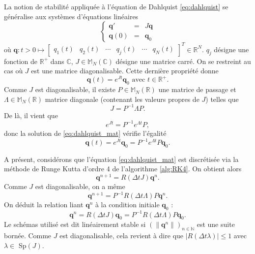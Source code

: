 La notion de stabilité appliquée à l'équation de Dahlquist \eqref{eq:dahlquist} se généralise aux systèmes d'équations linéaires
\begin{equation}
\left\lbrace
\begin{array}{rcl}
\mathbf{q}' & = & J \mathbf{q} \\
\mathbf{q}(0) & = & \mathbf{q}_0 
\end{array}
\right.
\label{eq:dahlquist_mat}
\end{equation}
où $\mathbf{q} : t>0 \mapsto \begin{bmatrix}
q_1(t) & q_2(t) & \cdots & q_j(t) & \cdots & q_N(t)
\end{bmatrix}^T \in \mathbb{R}^N$.
$q_j$ désigne une fonction de $\mathbb{R}^+$ dans $\mathbb{C}$, $J \in \mathbb{M}_N (\mathbb{C})$ désigne une matrice carré. On se restreint au cas où $J$ est une matrice diagonalisable.
Cette dernière propriété donne
\begin{equation}
\mathbf{q}(t) = e^{Jt}\mathbf{q}_0 \text{ avec } t \in \mathbb{R}^+.
\end{equation}
Comme $J$ est diagonalisable, il existe $P \in \mathbb{M}_N(\mathbb{R})$ une matrice de passage et $\Lambda \in \mathbb{M}_N(\mathbb{R})$ matrice diagonale (contenant les valeurs propres de $J$) telles que
\begin{equation}
J = P^{-1} \Lambda P.
\end{equation}
De là, il vient que 
\begin{equation}
e^{Jt} = P^{-1}e^{\Lambda t}P,
\end{equation}
donc la solution de \eqref{eq:dahlquist_mat} vérifie l'égalité 
\begin{equation}
\mathbf{q}(t) = e^{Jt}\mathbf{q}_0 = P^{-1}e^{\Lambda t}P\mathbf{q}_0.
\end{equation}

A présent, considérons que l'équation \eqref{eq:dahlquist_mat} est discrétisée via la méthode de Runge Kutta d'ordre 4 de l'algorithme \ref{alg:RK4}. On obtient alors 
\begin{equation}
\mathbf{q}^{n+1} = R(\Delta t J) \mathbf{q}^n.
\end{equation}
Comme $J$ est diagonalisable, on a même
\begin{equation}
\mathbf{q}^{n+1} = P^{-1}R(\Delta t \Lambda)P \mathbf{q}^n.
\end{equation}
On déduit la relation liant $\mathbf{q}^n$ à la condition initiale $\mathbf{q}_0$ : 
\begin{equation}
\mathbf{q}^n = R(\Delta t J) \mathbf{q}_0 = P^{-1}R(\Delta t \Lambda)P \mathbf{q}_0.
\end{equation}
Le schémas utilisé est dit linéairement stable si $\left( \| \mathbf{q}^n \| \right)_{n \in \mathbb{N}}$ est une suite bornée. Comme $J$ est diagonalisable, cela revient à dire que $| R(\Delta t \lambda) | \leq 1$ avec $\lambda \in $ Sp$(J)$.

